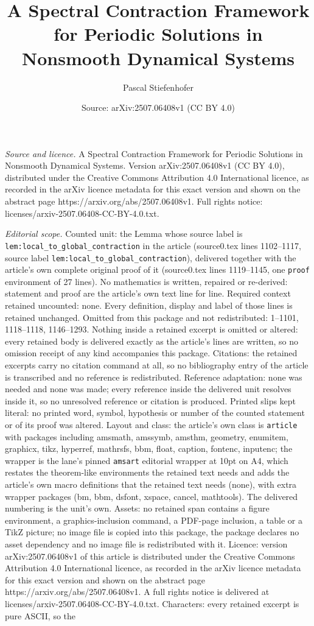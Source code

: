 \documentclass[10pt,a4paper]{amsart}
\title[A Spectral Contraction Framework for Periodic Solutions in N]{A Spectral Contraction Framework for Periodic Solutions in Nonsmooth Dynamical Systems}
\author{Pascal Stiefenhofer}
\date{Source: arXiv:2507.06408v1 (CC BY 4.0)}
\begin{document}
\maketitle

\noindent\emph{Source and licence.} A Spectral Contraction Framework for Periodic Solutions in Nonsmooth Dynamical Systems. Version arXiv:2507.06408v1 (CC BY 4.0), distributed under the Creative Commons Attribution 4.0 International licence, as recorded in the arXiv licence metadata for this exact version and shown on the abstract page https://arxiv.org/abs/2507.06408v1. Full rights notice: licenses/arxiv-2507.06408-CC-BY-4.0.txt.\par\smallskip

\noindent\textit{Editorial scope.} Counted unit: the Lemma whose source label is \texttt{lem:local\_to\_global\_contraction} in the article (source0.tex lines 1102--1117, source label \texttt{lem:local\_to\_global\_contraction}), delivered together with the article's own complete original proof of it (source0.tex lines 1119--1145, one \texttt{proof} environment of 27 lines). No mathematics is written, repaired or re-derived: statement and proof are the article's own text line for line. Required context retained uncounted: none. Every definition, display and label of those lines is retained unchanged. Omitted from this package and not redistributed: 1--1101, 1118--1118, 1146--1293. Nothing inside a retained excerpt is omitted or altered: every retained body is delivered exactly as the article's lines are written, so no omission receipt of any kind accompanies this package. Citations: the retained excerpts carry no citation command at all, so no bibliography entry of the article is transcribed and no reference is redistributed. Reference adaptation: none was needed and none was made; every reference inside the delivered unit resolves inside it, so no unresolved reference or citation is produced. Printed slips kept literal: no printed word, symbol, hypothesis or number of the counted statement or of its proof was altered. Layout and class: the article's own class is \texttt{article} with packages including amsmath, amssymb, amsthm, geometry, enumitem, graphicx, tikz, hyperref, mathrsfs, bbm, float, caption, fontenc, inputenc; the wrapper is the lane's pinned \texttt{amsart} editorial wrapper at 10pt on A4, which restates the theorem-like environments the retained text needs and adds the article's own macro definitions that the retained text needs (none), with extra wrapper packages (bm, bbm, dsfont, xspace, cancel, mathtools). The delivered numbering is the unit's own. Assets: no retained span contains a figure environment, a graphics-inclusion command, a PDF-page inclusion, a table or a TikZ picture; no image file is copied into this package, the package declares no asset dependency and no image file is redistributed with it. Licence: version arXiv:2507.06408v1 of this article is distributed under the Creative Commons Attribution 4.0 International licence, as recorded in the arXiv licence metadata for this exact version and shown on the abstract page https://arxiv.org/abs/2507.06408v1. A full rights notice is delivered at licenses/arxiv-2507.06408-CC-BY-4.0.txt. Characters: every retained excerpt is pure ASCII, so the 
\end{document}
